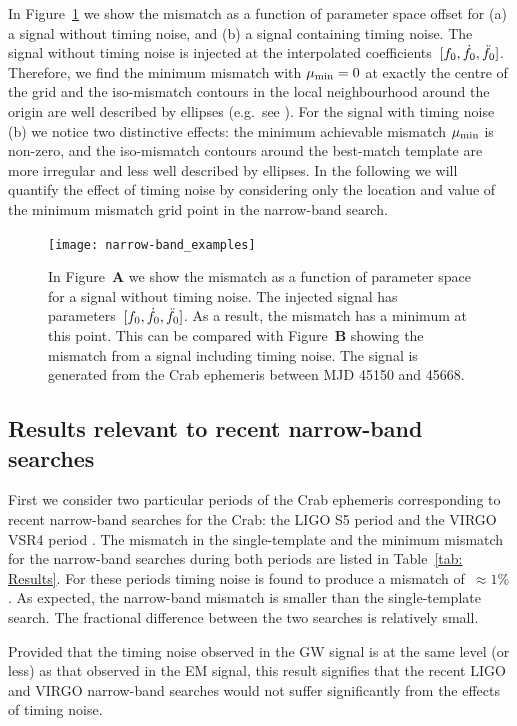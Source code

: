 \documentclass[../full_thesis/full_thesis.tex]{subfiles}
\begin{document}
In Figure~\ref{fig: narrow-band example} we show the mismatch as a function of
parameter space offset for (a) a signal without timing noise, and (b) a signal
containing timing noise. The signal without timing noise is injected at the
interpolated coefficients~$[f_{0}, \dot{f}_{0}, \ddot{f}_{0}]$.  Therefore, we find
the minimum mismatch with $\mu_{\mathrm{min}}=0$ at exactly the centre of the grid and the
iso-mismatch contours in the local neighbourhood around the origin are well
described by ellipses (e.g.\ see \citet{Prix2007}).  For the signal with timing
noise (b) we notice two distinctive effects: the minimum achievable mismatch
$\mu_{\mathrm{min}}$ is non-zero, and the iso-mismatch contours around the best-match
template are more irregular and less well described by ellipses.  In the
following we will quantify the effect of timing noise by considering only the
location and value of the minimum mismatch grid point in the narrow-band
search.
\begin{figure}[htb]
\centering
\texttt{[image: narrow-band\_examples]}
\caption{In Figure~{\bf A} we show the mismatch as a function of parameter space
    for a signal without timing noise. The injected signal has
    parameters~$[f_{0}, \dot{f}_{0}, \ddot{f}_{0}]$. As a result, the mismatch has
    a minimum at this point. This can be compared with Figure~{\bf B} showing the
mismatch from a signal including timing noise. The signal is generated from the
Crab ephemeris between MJD 45150 and 45668.}
\label{fig: narrow-band example}
\end{figure}


\subsection{Results relevant to recent narrow-band searches}

First we consider two particular periods of the Crab ephemeris corresponding to
recent narrow-band searches for the Crab: the LIGO S5 period \citep{abbott2008beating}
and the VIRGO VSR4 period \citep{aasi2015narrow}. The mismatch in the single-template
and the minimum mismatch for the narrow-band searches during both periods are
listed in Table~\ref{tab: Results}. For these periods timing noise is
found to produce a mismatch of~$\approx 1\%$. As expected, the narrow-band
mismatch is smaller than the single-template search. The fractional difference
between the two searches is relatively small.

Provided that the timing noise observed in the GW signal is at the same level
(or less) as that observed in the EM signal, this result signifies that the
recent LIGO and VIRGO narrow-band searches would not suffer significantly
from the effects of timing noise.
\end{document}
